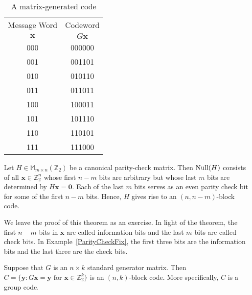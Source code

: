  
\begin{table}[htb]
{\small
\begin{center}
\begin{tabular}{|c|c|}
\hline
Message Word  & Codeword \\
${\mathbf x}$ & $G {\mathbf x}$ \\ \hline
000 & 000000 \\
001 & 001101 \\
010 & 010110 \\
011 & 011011 \\
100 & 100011 \\
101 & 101110 \\
110 & 110101 \\
111 & 111000 \\
\hline
\end{tabular}
\end{center}\label{matrix_gen_code}
}
\caption{A matrix-generated code}
\end{table}
 
 
\begin{theorem}
Let $H \in {\mathbb M}_{m \times n}({\mathbb Z}_2)$ be a canonical
parity-check matrix. Then ${\rm Null}(H)$ consists of all 
${\mathbf x} \in {\mathbb
Z}_2^n$ whose first $n-m$ bits are arbitrary but whose last $m$ bits
are determined by $H{\mathbf x} = {\mathbf 0}$. Each of
the last $m$ bits serves as an even parity check bit for some of the
first $n-m$ bits. Hence, $H$ gives rise to an $(n, n-m)$-block code. 
\end{theorem}
 
 
We leave the proof of this theorem as an exercise. In light of the
theorem, the first $n - m$ bits in ${\mathbf x}$ are called {\bfi
information bits\/} and the last $m$ bits are called {\bfi check bits}.
In Example~\ref{ParityCheckFix},  %
the first three bits are the information bits
and the last three are the check bits.
 
 
\begin{theorem}
Suppose that $G$ is an $n \times k$  standard generator matrix.  Then
\mbox{$C = \{ {\mathbf y} : G {\mathbf x} ={\mathbf y} \mbox{ for ${\mathbf x} \in
{\mathbb  Z}_2^k$} \}$} is an  $(n,k)$-block code. More specifically, $C$
is a group code.  
\end{theorem}
 
